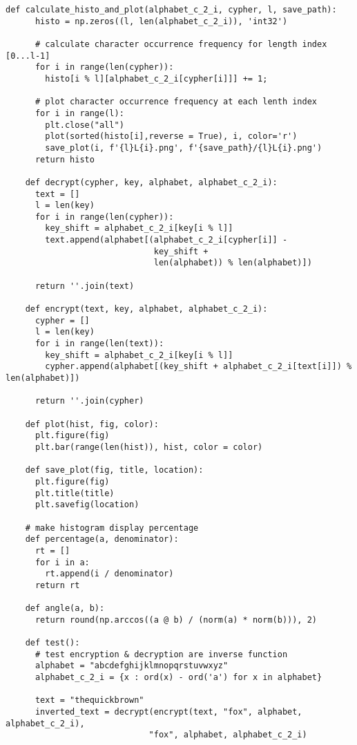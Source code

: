 \documentclass[12pt,letterpaper]{article}
\begin{document}
\begin{lstlisting}[style = Python]
    def calculate_histo_and_plot(alphabet_c_2_i, cypher, l, save_path):
      histo = np.zeros((l, len(alphabet_c_2_i)), 'int32')
      
      # calculate character occurrence frequency for length index [0...l-1]
      for i in range(len(cypher)):
        histo[i % l][alphabet_c_2_i[cypher[i]]] += 1;
      
      # plot character occurrence frequency at each lenth index
      for i in range(l):
        plt.close("all")
        plot(sorted(histo[i],reverse = True), i, color='r')
        save_plot(i, f'{l}L{i}.png', f'{save_path}/{l}L{i}.png')
      return histo
    
    def decrypt(cypher, key, alphabet, alphabet_c_2_i):
      text = []
      l = len(key)
      for i in range(len(cypher)):
        key_shift = alphabet_c_2_i[key[i % l]]
        text.append(alphabet[(alphabet_c_2_i[cypher[i]] - 
                              key_shift + 
                              len(alphabet)) % len(alphabet)])

      return ''.join(text)
    
    def encrypt(text, key, alphabet, alphabet_c_2_i):
      cypher = []
      l = len(key)
      for i in range(len(text)):
        key_shift = alphabet_c_2_i[key[i % l]]
        cypher.append(alphabet[(key_shift + alphabet_c_2_i[text[i]]) % len(alphabet)])

      return ''.join(cypher)
    
    def plot(hist, fig, color):
      plt.figure(fig)
      plt.bar(range(len(hist)), hist, color = color)
    
    def save_plot(fig, title, location):
      plt.figure(fig)
      plt.title(title)
      plt.savefig(location)
    
    # make histogram display percentage 
    def percentage(a, denominator):
      rt = []
      for i in a:
        rt.append(i / denominator)
      return rt
    
    def angle(a, b):
      return round(np.arccos((a @ b) / (norm(a) * norm(b))), 2)
    
    def test():
      # test encryption & decryption are inverse function
      alphabet = "abcdefghijklmnopqrstuvwxyz"
      alphabet_c_2_i = {x : ord(x) - ord('a') for x in alphabet}
    
      text = "thequickbrown"
      inverted_text = decrypt(encrypt(text, "fox", alphabet, alphabet_c_2_i),
                             "fox", alphabet, alphabet_c_2_i)
    

\end{lstlisting}
\end{document}
